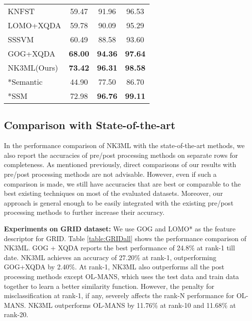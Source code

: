 \documentclass[runningheads]{llncs}
\begin{document}
\begin{table}[t]
\begin{center}
{\begin{tabular}[b]{|l|c|c|c|}
KNFST\cite{Zheng:nfst} &	 59.47	&	91.96	&	96.53\\
LOMO+XQDA\cite{LOMO}		&	59.78	&	90.09	&	95.29	\\
SSSVM\cite{SSSVM}		&	60.49	&	88.58	&	93.60	\\
GOG+XQDA\cite{GOG}		&	\color{blue}\textbf{68.00} 	&	\color{blue}\textbf{94.36}	&	\color{blue}\textbf{97.64}	\\
NK3ML(Ours) & \color{red}\textbf{73.42}	& \color{red}\textbf{96.31}	& \color{red}\textbf{98.58}\\
\hline \hline
*Semantic\cite{Symantic}		&	44.90	&	77.50	&	86.70	\\
*SSM\cite{song:scalableManifold}	&	72.98	&	\color{red}\textbf{96.76}	&	\color{red}\textbf{99.11}	\\
\hline
\end{tabular}
\label{table:PRID450Sall}
}
\end{center}
\end{table}

\subsection{Comparison with State-of-the-art}
In the performance comparison of NK3ML with the state-of-the-art methods, \color{black} we also report the accuracies of pre/post processing methods on separate rows for completeness. As mentioned previously, direct comparisons of our results with pre/post processing methods are not advisable. However, even if such a comparison is made, we still have accuracies that are best or comparable to the best existing techniques on most of the evaluated datasets. Moreover, our approach is general enough to be easily integrated with the existing pre/post processing methods to further increase their accuracy.


\setlength{\parskip}{0.5mm}
\noindent \textbf{Experiments on GRID dataset:} We use GOG and LOMO* as the feature descriptor for GRID.
Table \ref{table:GRIDall} shows the performance comparison of NK3ML.
 GOG + XQDA\cite{GOG} reports the best performance of 24.8\% at rank-1 till date. NK3ML achieves an accuracy of 27.20\% at rank-1, outperforming GOG+XQDA by 2.40\%.
At rank-1, NK3ML also outperforms all the post processing methods except OL-MANS\cite{OnlineNegSamples}, which uses the test data and train data together to learn a better similarity function. However, the penalty for misclassification at rank-1, if any,  severely affects the rank-N performance for OL-MANS. NK3ML outperforms OL-MANS by 11.76\% at rank-10 and 11.68\% at rank-20.
\end{document}
